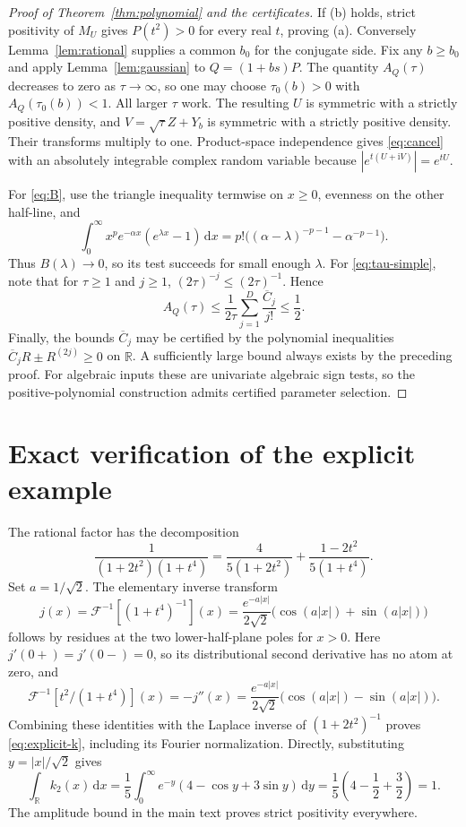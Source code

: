 \documentclass[11pt,twoside]{article}
\theoremstyle{journalplain}
\numberwithin{equation}{section}
\theoremstyle{journaldefinition}
\newcommand{\R}{\mathbb R}
\newcommand{\dd}{\,\mathrm d}
\newcommand{\ii}{\mathrm i}
\begin{document}
\begin{proof}[Proof of Theorem~\ref{thm:polynomial} and the certificates]
If (b) holds, strict positivity of $M_U$ gives $P(t^2)>0$ for every real $t$, proving (a). Conversely Lemma~\ref{lem:rational} supplies a common $b_0$ for the conjugate side. Fix any $b\ge b_0$ and apply Lemma~\ref{lem:gaussian} to $Q=(1+bs)P$. The quantity $A_Q(\tau)$ decreases to zero as $\tau\to\infty$, so one may choose $\tau_0(b)>0$ with $A_Q(\tau_0(b))<1$. All larger $\tau$ work. The resulting $U$ is symmetric with a strictly positive density, and $V=\sqrt\tau Z+Y_b$ is symmetric with a strictly positive density. Their transforms multiply to one. Product-space independence gives \eqref{eq:cancel} with an absolutely integrable complex random variable because $|e^{t(U+\ii V)}|=e^{tU}$.

For \eqref{eq:B}, use the triangle inequality termwise on $x\ge0$, evenness on the other half-line, and
\[
 \int_0^\infty x^pe^{-\alpha x}(e^{\lambda x}-1)\dd x
 =p!\bigl((\alpha-\lambda)^{-p-1}-\alpha^{-p-1}\bigr).
\]
Thus $B(\lambda)\to0$, so its test succeeds for small enough $\lambda$. For \eqref{eq:tau-simple}, note that for $\tau\ge1$ and $j\ge1$, $(2\tau)^{-j}\le(2\tau)^{-1}$. Hence
\[
 A_Q(\tau)\le\frac1{2\tau}\sum_{j=1}^D\frac{\overline C_j}{j!}\le\frac12.
\]
Finally, the bounds $\overline C_j$ may be certified by the polynomial inequalities $\overline C_jR\pm R^{(2j)}\ge0$ on $\R$. A sufficiently large bound always exists by the preceding proof. For algebraic inputs these are univariate algebraic sign tests, so the positive-polynomial construction admits certified parameter selection.
\end{proof}

\section{Exact verification of the explicit example}\label{app:example}
The rational factor has the decomposition
\begin{equation}\label{eq:partial}
 \frac1{(1+2t^2)(1+t^4)}
 =\frac4{5(1+2t^2)}+\frac{1-2t^2}{5(1+t^4)}.
\end{equation}
Set $a=1/\sqrt2$. The elementary inverse transform
\[
 j(x)=\mathcal F^{-1}[(1+t^4)^{-1}](x)
 =\frac{e^{-a|x|}}{2\sqrt2}\bigl(\cos(a|x|)+\sin(a|x|)\bigr)
\]
follows by residues at the two lower-half-plane poles for $x>0$. Here $j'(0+)=j'(0-)=0$, so its distributional second derivative has no atom at zero, and
\[
 \mathcal F^{-1}[t^2/(1+t^4)](x)=-j''(x)
 =\frac{e^{-a|x|}}{2\sqrt2}\bigl(\cos(a|x|)-\sin(a|x|)\bigr).
\]
Combining these identities with the Laplace inverse of $(1+2t^2)^{-1}$ proves \eqref{eq:explicit-k}, including its Fourier normalization. Directly, substituting $y=|x|/\sqrt2$ gives
\[
 \int_\R k_2(x)\dd x
 =\frac15\int_0^\infty e^{-y}(4-\cos y+3\sin y)\dd y
 =\frac15\left(4-\frac12+\frac32\right)=1.
\]
The amplitude bound in the main text proves strict positivity everywhere.
\end{document}
